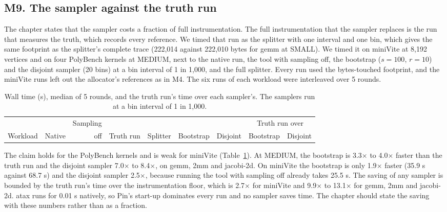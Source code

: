 \documentclass[11pt]{article}
\newcommand{\tabinput}[1]{}
\begin{document}
\subsection{M9. The sampler against the truth run}
\label{sec:m9}

The chapter states that the sampler costs a fraction of full instrumentation. The full instrumentation that the
sampler replaces is the run that measures the truth, which records every reference. We timed that run as the
splitter with one interval and one bin, which gives the same footprint as the splitter's complete trace (222,014
against 222,010 bytes for gemm at SMALL). We timed it on miniVite at 8,192 vertices and on four PolyBench kernels at
MEDIUM, next to the native run, the tool with sampling off, the bootstrap ($s=100$, $r=10$) and the disjoint sampler
(20 bins) at a bin interval of 1 in 1,000, and the full splitter. Every run used the bytes-touched footprint, and the
miniVite runs left out the allocator's references as in M4. The six runs of each workload were interleaved over 5
rounds.

\begin{table}[htbp]
\centering
\caption{Wall time (s), median of 5 rounds, and the truth run's time over each sampler's. The samplers run at a bin
interval of 1 in 1,000.}
\label{tab:m9}
\footnotesize
\setlength{\tabcolsep}{4pt}
\begin{tabular}{@{}lrrrrrrrr@{}}
\toprule
& & Sampling & & & & & \multicolumn{2}{c}{Truth run over} \\
\cmidrule(l){8-9}
Workload & Native & off & Truth run & Splitter & Bootstrap & Disjoint & Bootstrap & Disjoint \\
\midrule
\tabinput{m9}
\bottomrule
\end{tabular}
\end{table}

The claim holds for the PolyBench kernels and is weak for miniVite (Table~\ref{tab:m9}). At MEDIUM, the bootstrap
is 3.3$\times$ to 4.0$\times$ faster than the truth run and the disjoint sampler 7.0$\times$ to 8.4$\times$, on
gemm, 2mm and jacobi-2d. On miniVite the bootstrap is only 1.9$\times$ faster (35.9 s against 68.7 s) and the
disjoint sampler 2.5$\times$, because running the tool with sampling off already takes 25.5 s. The saving of any
sampler is bounded by the truth run's time over the instrumentation floor, which is 2.7$\times$ for miniVite and
9.9$\times$ to 13.1$\times$ for gemm, 2mm and jacobi-2d. atax runs for 0.01 s natively, so Pin's start-up
dominates every run and no sampler saves time. The chapter should state the saving with these numbers rather than
as a fraction.
\end{document}
